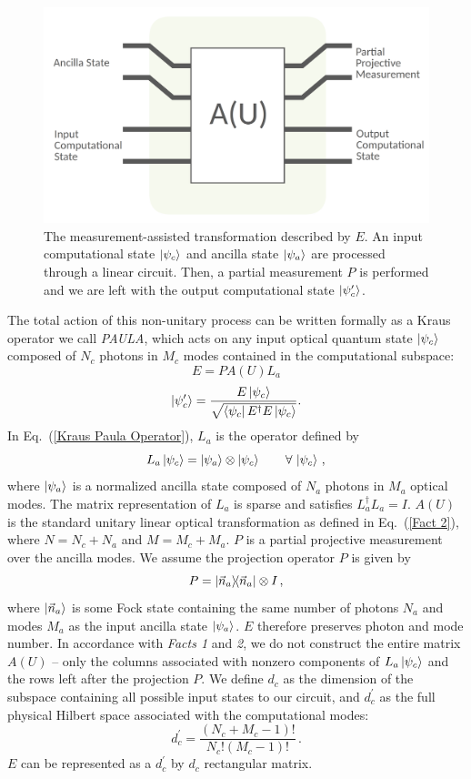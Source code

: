 \documentclass[aps,pra,twocolumn,superscriptaddress,floatfix,10pt]{revtex4}
\begin{document}
 \begin{figure}[h]
 	\centering
 	\includegraphics[width=0.5 \textwidth]{./PAULA.pdf}
 	\caption{The measurement-assisted transformation described by $E$. An input computational state $\ket{\psi_c}$ and ancilla state $\ket{\psi_a}$ are processed through a linear circuit. Then, a partial measurement $P$ is performed and we are left with the output computational state $\ket{\psi_c^\prime}$.}
 	\label{Figure - PAULA Operator}
 \end{figure}
The total action of this non-unitary process can be written formally as a Kraus operator we call \textit{PAULA}, which acts on any input optical quantum state $\ket{\psi_{c}}$ composed of $N_c$ photons in $M_c$ modes contained in the computational subspace:
\begin{equation}
\label{Kraus Paula Operator}
E = P A(U) L_a
\end{equation} 
\begin{equation}
\ket{\psi_{c}^\prime} = \frac{E \ket{\psi_{c}}}{\sqrt{ \bra{\psi_c} E^\dagger E \ket{\psi_c} }}.
\end{equation}
In Eq.~(\ref{Kraus Paula Operator}), $L_a$ is the operator defined by
\begin{equation}
\label{Ancilla Linker}
L_a \ket{\psi_{c}} = \ket{\psi_a} \otimes \ket{\psi_{c}} \quad \quad  \forall \, \ket{\psi_{c}} \,,
\end{equation}
where $\ket{\psi_a}$ is a normalized ancilla state composed of $N_a$ photons in $M_a$ optical modes. The matrix representation of $L_a$ is sparse and satisfies $L_a^\dagger L_a = I$.
$A(U)$ is the standard unitary linear optical transformation as defined in Eq.~(\ref{Fact 2}), where $N=N_c+N_a$ and $M=M_c+M_a$. $P$ is a partial projective measurement over the ancilla modes. We assume the projection operator $P$ is given by
\begin{equation}
P = \outerproduct{\vec{n}_a}{\vec{n}_a} \otimes I\,,
\end{equation}
where $\ket{\vec{n}_a}$ is some Fock state 
containing the same number of photons $N_a$ and modes $M_a$ as the input ancilla state $\ket{\psi_a}$. $E$ therefore preserves photon and mode number. In accordance with \textit{Facts 1} and \textit{2}, we do not construct the entire matrix $A(U)$ -- only the columns associated with nonzero components of $L_a \ket{\psi_{c}}$ and the rows left after the projection $P$. We define $d_c$ as the dimension of the subspace containing all possible input states to our circuit, and $d_c^\prime$ as the full physical Hilbert space associated with the computational modes:
\begin{equation}
	d_c^\prime = \frac{(N_c+M_c-1)!}{N_c! (M_c-1)!} \,.
\end{equation}
$E$ can be represented as a $d_c^\prime$ by $d_c$ rectangular matrix.
\end{document}
